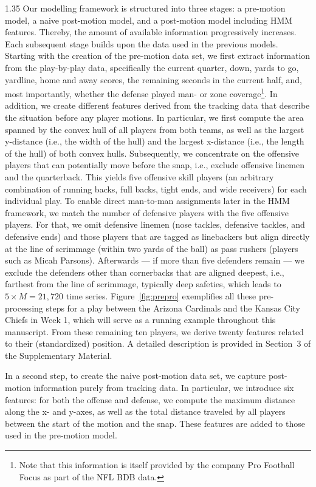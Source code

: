 \documentclass[12pt,a4paper]{article}
\begin{document}
\begin{spacing}{1.35}
Our modelling framework is structured into three stages: a pre-motion model, a naive post-motion model, and a post-motion model including HMM features. Thereby, the amount of available information progressively increases. Each subsequent stage builds upon the data used in the previous models.
Starting with the creation of the pre-motion data set, we first extract information from the play-by-play data, specifically the current quarter, down, yards to go, yardline, home and away scores, the remaining seconds in the current half, and, most importantly, whether the defense played man- or zone coverage\footnote{Note that this information is itself provided by the company Pro Football Focus as part of the NFL BDB data.}. In addition, we create different features derived from the tracking data that describe the situation before any player motions. In particular, we first compute the area spanned by the convex hull of all players from both teams, as well as the largest y-distance (i.e., the width of the hull) and the largest x-distance (i.e., the length of the hull) of both convex hulls. 
Subsequently, we concentrate on the offensive players that can potentially move before the snap, i.e., exclude offensive linemen and the quarterback. This yields five offensive skill players (an arbitrary combination of running backs, full backs, tight ends, and wide receivers) for each individual play. 
To enable direct man-to-man assignments later in the HMM framework, we match the number of defensive players with the five offensive players. For that, we omit defensive linemen (nose tackles, defensive tackles, and defensive ends) and those players that are tagged as linebackers but align directly at the line of scrimmage (within two yards of the ball) as pass rushers (players such as Micah Parsons).
Afterwards --- if more than five defenders remain --- we exclude the defenders other than cornerbacks that are aligned deepest, i.e., farthest from the line of scrimmage, typically deep safeties, which leads to $5 \times M = 21{,}720$ time series. Figure~\ref{fig:prepro} exemplifies all these pre-processing steps for a play between the Arizona Cardinals and the Kansas City Chiefs in Week 1, which will serve as a running example throughout this manuscript.
From these remaining ten players, we derive twenty features related to their (standardized) position. A detailed description is provided in Section~3 of the  Supplementary Material.

In a second step, to create the naive post-motion data set, we capture post-motion information purely from tracking data. In particular, we introduce six features: for both the offense and defense, we compute the maximum distance along the x- and y-axes, as well as the total
distance traveled by all players between the start of the motion and the snap. These features are added to those used in the pre-motion model.


\end{spacing}
\end{document}
